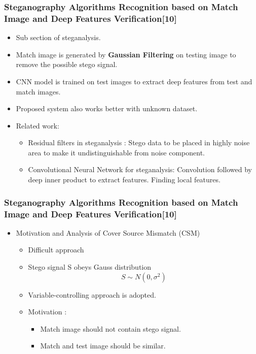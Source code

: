 \documentclass{beamer} %
\theoremstyle{definition} %
\begin{document}
\begin{frame}
	\frametitle{Steganography Algorithms Recognition based on Match Image and Deep Features Verification[10] }
	\begin{itemize}
		\item Sub section of steganalysis.
		\item Match image is generated by \textbf{Gaussian Filtering} on testing image to remove the possible stego signal.
		\item CNN model is trained on test images to extract deep features from test and match images.
		\item Proposed system also works better with unknown dataset.
		\item Related work:
		\begin{itemize}
			\item Residual filters in steganalysis : Stego data to be placed in highly noise area to make it undistinguishable from noise component.
			\item Convolutional Neural Network for steganalysis: Convolution followed by deep inner product to extract features.
			Finding local features.
		\end{itemize}
	
	\end{itemize}
\end{frame}


\begin{frame}
\frametitle{Steganography Algorithms Recognition based on Match Image and Deep Features Verification[10] }
	\begin{itemize}
\item Motivation and Analysis of Cover Source Mismatch (CSM)
\begin{itemize}
	\item Difficult approach 
	\item Stego signal S obeys Gauss distribution
	\begin{equation}
	S \sim N (0,\sigma^2)
	\end{equation}
	\item Variable-controlling approach is adopted.
	\item Motivation :
	\begin{itemize}
		\item Match image should not contain stego signal.
		\item Match and test image should be similar.
	\end{itemize}
\end{itemize}
	\end{itemize}
\end{frame}
\end{document}
